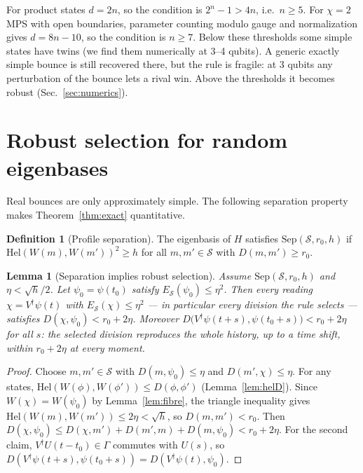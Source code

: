 \documentclass[11pt]{article}
\newtheorem{lemma}[theorem]{Lemma}
\theoremstyle{definition}
\newtheorem{definition}[theorem]{Definition}
\theoremstyle{remark}
\newcommand{\Hel}{\mathrm{Hel}}
\begin{document}
For product states $d=2n$, so the condition is $2^n-1>4n$, i.e.\ $n\ge5$. For $\chi=2$ MPS with open boundaries, parameter counting modulo gauge and normalization gives $d=8n-10$, so the condition is $n\ge7$. Below these thresholds some simple states have twins (we find them numerically at 3--4 qubits). A generic exactly simple bounce is still recovered there, but the rule is fragile: at 3 qubits any perturbation of the bounce lets a rival win. Above the thresholds it becomes robust (Sec.~\ref{sec:numerics}).

\section{Robust selection for random eigenbases}
\label{sec:robust}

Real bounces are only approximately simple. The following separation property makes Theorem~\ref{thm:exact} quantitative.

\begin{definition}[Profile separation]
The eigenbasis of $H$ satisfies $\mathrm{Sep}(\mathcal S,r_0,h)$ if $\Hel(W(m),W(m'))^2\ge h$ for all $m,m'\in\mathcal S$ with $D(m,m')\ge r_0$.
\end{definition}

\begin{lemma}[Separation implies robust selection]\label{lem:robust}
Assume $\mathrm{Sep}(\mathcal S,r_0,h)$ and $\eta<\sqrt h/2$. Let $\psi_0=\psi(t_0)$ satisfy $E_{\mathcal S}(\psi_0)\le\eta^2$. Then every reading $\chi=V^\dagger\psi(t)$ with $E_{\mathcal S}(\chi)\le\eta^2$ --- in particular every division the rule selects --- satisfies $D(\chi,\psi_0)<r_0+2\eta$. Moreover $D\big(V^\dagger\psi(t+s),\psi(t_0+s)\big)<r_0+2\eta$ for all $s$: the selected division reproduces the whole history, up to a time shift, within $r_0+2\eta$ at every moment.
\end{lemma}
\begin{proof}
Choose $m,m'\in\mathcal S$ with $D(m,\psi_0)\le\eta$ and $D(m',\chi)\le\eta$. For any states, $\Hel(W(\phi),W(\phi'))\le D(\phi,\phi')$ (Lemma~\ref{lem:helD}). Since $W(\chi)=W(\psi_0)$ by Lemma~\ref{lem:fibre}, the triangle inequality gives $\Hel(W(m),W(m'))\le2\eta<\sqrt h$, so $D(m,m')<r_0$. Then $D(\chi,\psi_0)\le D(\chi,m')+D(m',m)+D(m,\psi_0)<r_0+2\eta$. For the second claim, $V^\dagger U(t-t_0)\in\Gamma$ commutes with $U(s)$, so $D(V^\dagger\psi(t+s),\psi(t_0+s))=D(V^\dagger\psi(t),\psi_0)$.
\end{proof}
\end{document}

